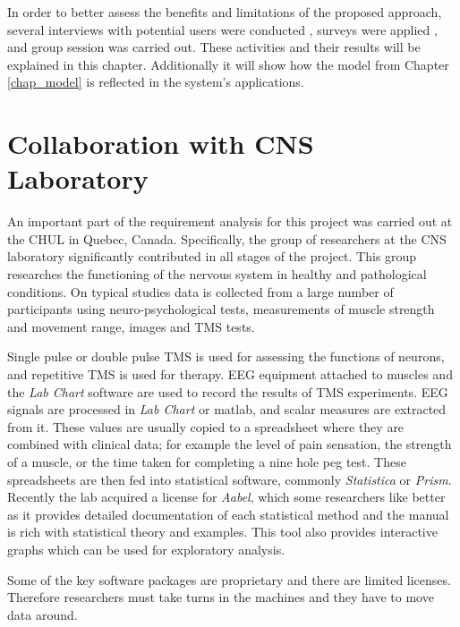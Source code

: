 In order to better assess the benefits and limitations of the proposed approach, several interviews with potential users were conducted , surveys were applied , and group session was carried out. These activities and their results will be explained in this chapter. Additionally it will show how the model from Chapter \ref{chap_model} is reflected in the system's applications.	


\section{Collaboration with CNS Laboratory}

An important part of the requirement analysis for this project was carried out at the CHUL in Quebec, Canada. Specifically, the group of researchers at the CNS laboratory significantly contributed in all stages of the project. This group researches the functioning of the nervous system in healthy and pathological conditions. On typical studies data is collected from a large number of participants using neuro-psychological tests, measurements of muscle strength and movement range, images and TMS tests. 

Single pulse or double pulse TMS is used for assessing the functions of neurons, and repetitive TMS is used for therapy. EEG equipment attached to muscles and the \emph{Lab Chart} software are used to record the results of TMS experiments. EEG signals are processed in \emph{Lab Chart} or matlab, and scalar measures are extracted from it. These values are usually  copied to a spreadsheet where they are combined with clinical data; for example the level of pain sensation, the strength of a muscle, or the time taken for completing a nine hole peg test. These spreadsheets are then fed into statistical software, commonly \emph{Statistica} or \emph{Prism}. Recently the lab acquired a license for \emph{Aabel}, which some researchers like better as it provides detailed documentation of each statistical method and the manual is  rich with statistical theory and examples. This tool also provides interactive graphs which can be used for exploratory analysis. 

Some of the key software packages are proprietary and there are limited licenses. Therefore researchers must take turns in the machines and they have to move data around.

